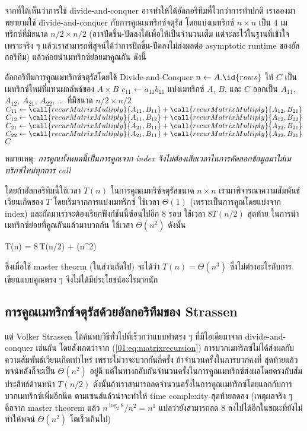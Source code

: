 จากที่ได้เห็นว่าการใช้ divide-and-conquer อาจทำให้ได้อัลกอริทึมที่ไวกว่าการทำปกติ เราลองมาพยายามใช้ divide-and-conquer กับการคูณเมทริกซ์จตุรัส โดยแบ่งเมทริกซ์ $n\times n$ เป็น $4$ เมทริกซ์ที่มีขนาด $n/2\times n/2$ (อาจปัดขึ้น-ปัดลงได้เพื่อให้เป็นจำนวนเต็ม แต่จะละไว้ในฐานที่เข้าใจเพราะจริง ๆ แล้วเราสามารถพิสูจน์ได้ว่าการปัดขึ้น-ปัดลงไม่ส่งผลต่อ asymptotic runtime ของอัลกอริทึม) แล้วค่อยนำเมทริกซ์ย่อยมาคูณกัน ดังนี้
\begin{codebox}{อัลกอริทึมการคูณเมทริกซ์จตุรัสโดยใช้ Divide-and-Conquer}
		\State $n \gets A.\id{rows}$
		\State ให้ $C$ เป็นเมทริกซ์ใหม่ที่แทนผลลัพธ์ของ $A\times B$
			\State $c_{11} \gets a_{11}b_{11}$ 
		\Else
			\State แบ่งเมทริกซ์ $A$, $B$, และ $C$ ออกเป็น $A_{11}$, $A_{12}$, $A_{21}$, $A_{22}$, \dots\ ที่มีขนาด $n/2 \times n/2$
			\State $C_{11} \gets \call{recurMatrixMultiply}{A_{11}, B_{11}} + \call{recurMatrixMultiply}{A_{12}, B_{21}}$
			\State $C_{12} \gets \call{recurMatrixMultiply}{A_{11}, B_{12}} + \call{recurMatrixMultiply}{A_{12}, B_{22}}$
			\State $C_{21} \gets \call{recurMatrixMultiply}{A_{21}, B_{11}} + \call{recurMatrixMultiply}{A_{22}, B_{21}}$
			\State $C_{22} \gets \call{recurMatrixMultiply}{A_{21}, B_{11}} + \call{recurMatrixMultiply}{A_{22}, B_{21}}$
		\EndIf
		\State \Return $C$
	\EndFunction
\end{codebox}
หมายเหตุ: \emph{การคูณทั้งหมดนี้เป็นการคูณจาก index จึงไม่ต้องเสียเวลาในการคัดลอกข้อมูลมาใส่เมทริกซ์ใหม่ทุกการ call}

โดยถ้าอัลกอริทึมนี้ใช้เวลา $T(n)$ ในการคูณเมทริซ์จตุรัสขนาด $n\times n$ เรามาพิจารณาความสัมพันธ์เวียนเกิดของ $T$ โดยเริมจากการแบ่งเมทริกซ์ ใช้เวลา $\Theta(1)$ (เพราะเป็นการคูณโดยแบ่งจาก index) และถัดมาเราจะต้องเรียกฟังก์ชันนี้ซ้อนไปอีก $8$ รอบ ใช้เวลา $8T(n/2)$ สุดท้าย ในการนำเมทริกซ์ย่อยที่คูณกันแล้วมาบวกกัน ใช้เวลา $\Theta(n^2)$ ดังนั้น
\begin{eqnobox}[label=01:eq:matrixrecursion]
	T(n) = 8\,T(n/2) + \Theta(n^2)
\end{eqnobox}
ซึ่งเมื่อใช้ master theorm (ในส่วนถัดไป) จะได้ว่า $T(n) = \Theta(n^3)$ ซึ่งไม่ต่างอะไรกับการเขียนแบบคูณตรง ๆ จึงไม่ได้มีประโยชน์อะไรมากนัก

\subsection{การคูณเมทริกซ์จตุรัสด้วยอัลกอริทึมของ Strassen}

แต่ Volker Strassen ได้ค้นพบวิธีทั่วไปที่เร็วกว่าแบบทำตรง ๆ ที่มีไอเดียมาจาก divide-and-conquer เช่นกัน โดยสังเกตว่าจาก (\ref{01:eq:matrixrecursion}) การบวกเมทริกซ์ไม่ได้ส่งผลกับความสัมพันธ์เวียนเกิดเท่าไหร่ เพราะไม่วาจะบวกกันกี่ครั้ง ถ้าจำนวนครั้งในการบวกคงที่ สุดท้ายแล้วพจน์หลังก็จะเป็น $\Theta(n^2)$ อยู่ดี แต่ในทางกลับกันจำนวนครั้งในการคูณเมทริกซ์ส่งผลโดยตรงกับสัมประสิทธ์ด้านหน้า $T(n/2)$ ดังนั้นถ้าเราสามารถลดจำนวนครั้งในการคูณเมทริกซ์โดยแลกกับการบวกเมทริกซ์เพิ่มอีกนิด ตามเซนส์แล้วน่าจะทำให้ time complexity สุดท้ายลดลง (เหตุผลจริง ๆ คือจาก master theorem แล้ว $n^{\log_2 8}/n^2 = n^1$ แปลว่ายังสามารถลด $8$ ลงไปได้อีกในขณะที่ยังไม่ทำให้พจน์ $\Theta(n^2)$ โตเร็วเกินไป)

